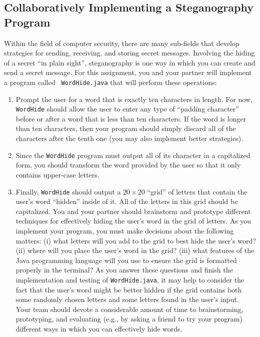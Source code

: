 \vspace{-0.1in}
\subsection*{Collaboratively Implementing a Steganography Program}
\vspace{-0.05in}

Within the field of computer security, there are many sub-fields that develop strategies for sending, receiving, and
storing secret messages.  Involving the hiding of a secret ``in plain sight'', steganography is one way in which you can
create and send a secret message. For this assignment, you and your partner will implement a program called {\tt
WordHide.java} that will perform these operations:

\vspace*{-.1in}

\begin{enumerate}

  \itemsep0in

  \item Prompt the user for a word that is exactly ten characters in length. For now, {\tt WordHide} should allow the
    user to enter any type of ``padding character'' before or after a word that is less than ten characters. If the word
    is longer than ten characters, then your program should simply discard all of the characters after the tenth one
    (you may also implement better strategies).

  \item Since the {\tt WordHide} program must output all of its character in a capitalized form, you should transform the
    word provided by the user so that it only contains upper-case letters.

  \item Finally, {\tt WordHide} should output a $20 \times 20$ ``grid'' of letters that contain the user's word
    ``hidden'' inside of it. All of the letters in this grid should be capitalized. You and your partner should
    brainstorm and prototype different techniques for effectively hiding the user's word in the grid of letters. As you
    implement your program, you must make decisions about the following matters: (i) what letters will you add to the
    grid to best hide the user's word? (ii) where will you place the user's word in the grid? (iii) what features of the
    Java programming language will you use to ensure the grid is formatted properly in the terminal? As you answer these
    questions and finish the implementation and testing of {\tt WordHide.java}, it may help to consider the fact that
    the user's word might be better hidden if the grid contains both some randomly chosen letters and some letters found
    in the user's input. Your team should devote a considerable amount of time to brainstorming, prototyping, and
    evaluating (e.g., by asking a friend to try your program) different ways in which you can effectively hide words.

\end{enumerate}

